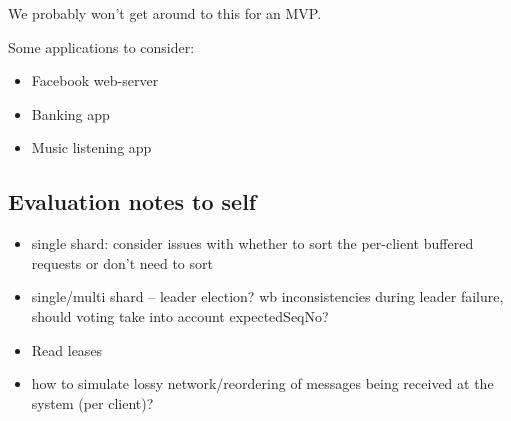 We probably won't get around to this for an MVP.

Some applications to consider:
\begin{itemize}
    \item Facebook web-server
    \item Banking app
    \item Music listening app
\end{itemize}
\subsection{Evaluation notes to self}
\begin{itemize}
    \item single shard: consider issues with whether to sort the per-client buffered requests or don't need to sort
    \item single/multi shard -- leader election? wb inconsistencies during leader failure, should voting take into account expectedSeqNo?
    \item Read leases
    \item how to simulate lossy network/reordering of messages being received at the system (per client)?
\end{itemize}
